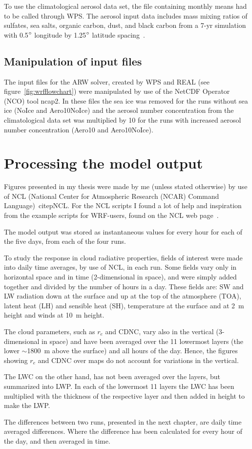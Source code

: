 To use the climatological aerosol data set, the file containing monthly means had to be called through WPS. The aerosol input data includes mass mixing ratios of sulfates, sea salts, organic carbon, dust, and black carbon from a 7-yr simulation with 0.5$\degree$ longitude by 1.25$\degree$ latitude spacing~\citep{Thompson2014}.

\subsection{Manipulation of input files}
The input files for the ARW solver, created by WPS and REAL (see figure~\ref{fig:wrfflowchart}) were manipulated by use of the NetCDF Operator (NCO) tool ncap2. In these files the sea ice was removed for the runs without sea ice (NoIce and Aero10NoIce) and the aerosol number concentration from the climatological data set was multiplied by 10 for the runs with increased aerosol number concentration (Aero10 and Aero10NoIce).

\section{Processing the model output}
Figures presented in my thesis were made by me (unless stated otherwise) by use of NCL (National Center for Atmospheric Research (NCAR) Command Language)~citep{NCL}. For the NCL scripts I found a lot of help and inspiration from the example scripts for WRF-users, found on the NCL web page~\citep{NCL}.

The model output was stored as instantaneous values for every hour for each of the five days, from each of the four runs. 

To study the response in cloud radiative properties, fields of interest were made into daily time averages, by use of NCL, in each run. Some fields vary only in horizontal space and in time (2-dimensional in space), and were simply added together and divided by the number of hours in a day. These fields are: SW and LW radiation down at the surface and up at the top of the atmosphere (TOA), latent heat (LH) and sensible heat (SH), temperature at the surface and at 2~m height and winds at 10~m height.

The cloud parameters, such as $r_e$ and CDNC, vary also in the vertical (3-dimensional in space) and have been averaged over the 11 lowermost layers (the lower $\sim$1800~m above the surface) and all hours of the day. Hence, the figures showing $r_e$ and CDNC over maps do not account for variations in the vertical.

The LWC on the other hand, has not been averaged over the layers, but summarized into LWP. In each of the lowermost 11 layers the LWC has been multiplied with the thickness of the respective layer and then added in height to make the LWP.

The differences between two runs, presented in the next chapter, are daily time averaged differences. Where the difference has been calculated for every hour of the day, and then averaged in time.